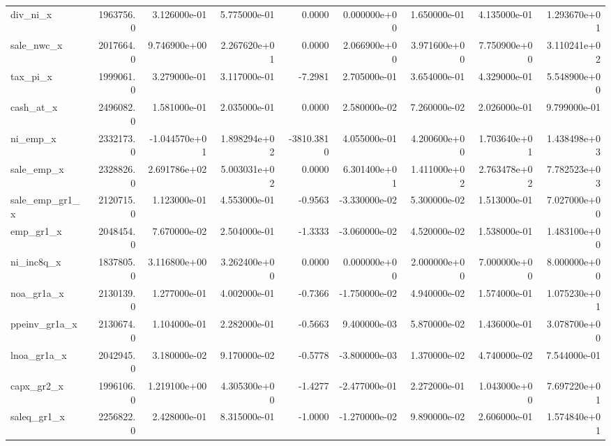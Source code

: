 \documentclass[12pt]{article}
\begin{document}
\begin{landscape}
\begin{longtable}{|l|r|r|r|r|r|r|r|r|}
div\_ni\_x                &  1963756.0 &  3.126000e-01 &  5.775000e-01 &      0.0000 &  0.000000e+00 &  1.650000e-01 &  4.135000e-01 &  1.293670e+01 \\
sale\_nwc\_x              &  2017664.0 &  9.746900e+00 &  2.267620e+01 &      0.0000 &  2.066900e+00 &  3.971600e+00 &  7.750900e+00 &  3.110241e+02 \\
tax\_pi\_x                &  1999061.0 &  3.279000e-01 &  3.117000e-01 &     -7.2981 &  2.705000e-01 &  3.654000e-01 &  4.329000e-01 &  5.548900e+00 \\
cash\_at\_x               &  2496082.0 &  1.581000e-01 &  2.035000e-01 &      0.0000 &  2.580000e-02 &  7.260000e-02 &  2.026000e-01 &  9.799000e-01 \\
ni\_emp\_x                &  2332173.0 & -1.044570e+01 &  1.898294e+02 &  -3810.3810 &  4.055000e-01 &  4.200600e+00 &  1.703640e+01 &  1.438498e+03 \\
sale\_emp\_x              &  2328826.0 &  2.691786e+02 &  5.003031e+02 &      0.0000 &  6.301400e+01 &  1.411000e+02 &  2.763478e+02 &  7.782523e+03 \\
sale\_emp\_gr1\_x          &  2120715.0 &  1.123000e-01 &  4.553000e-01 &     -0.9563 & -3.330000e-02 &  5.300000e-02 &  1.513000e-01 &  7.027000e+00 \\
emp\_gr1\_x               &  2048454.0 &  7.670000e-02 &  2.504000e-01 &     -1.3333 & -3.060000e-02 &  4.520000e-02 &  1.538000e-01 &  1.483100e+00 \\
ni\_inc8q\_x              &  1837805.0 &  3.116800e+00 &  3.262400e+00 &      0.0000 &  0.000000e+00 &  2.000000e+00 &  7.000000e+00 &  8.000000e+00 \\
noa\_gr1a\_x              &  2130139.0 &  1.277000e-01 &  4.002000e-01 &     -0.7366 & -1.750000e-02 &  4.940000e-02 &  1.574000e-01 &  1.075230e+01 \\
ppeinv\_gr1a\_x           &  2130674.0 &  1.104000e-01 &  2.282000e-01 &     -0.5663 &  9.400000e-03 &  5.870000e-02 &  1.436000e-01 &  3.078700e+00 \\
lnoa\_gr1a\_x             &  2042945.0 &  3.180000e-02 &  9.170000e-02 &     -0.5778 & -3.800000e-03 &  1.370000e-02 &  4.740000e-02 &  7.544000e-01 \\
capx\_gr2\_x              &  1996106.0 &  1.219100e+00 &  4.305300e+00 &     -1.4277 & -2.477000e-01 &  2.272000e-01 &  1.043000e+00 &  7.697220e+01 \\
saleq\_gr1\_x             &  2256822.0 &  2.428000e-01 &  8.315000e-01 &     -1.0000 & -1.270000e-02 &  9.890000e-02 &  2.606000e-01 &  1.574840e+01 \\

\end{longtable}
\end{landscape}
\end{document}
